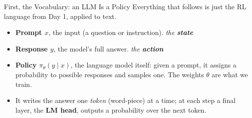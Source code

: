 \begin{frame}{First, the Vocabulary: an LLM Is a Policy}
Everything that follows is just the RL language from Day 1, applied to text.
\vfill
\begin{itemize}\itemsep0.4em\small
    \item \textbf{Prompt $x$}, the input (a question or instruction).
          \hfill \emph{the \textbf{state}}
    \item \textbf{Response $y$}, the model's full answer.
          \hfill \emph{the \textbf{action}}
    \item \textbf{Policy $\pi_\theta(y \mid x)$}, the language model itself:
          given a prompt, it assigns a probability to possible responses and
          samples one. The weights $\theta$ are what we train.
    \item It writes the answer one \emph{token} (word-piece) at a time; at each step
          a final layer, the \textbf{LM head}, outputs a probability over the
          next token.
\end{itemize}
\vfill
\begin{center}
\end{center}
\end{frame}

